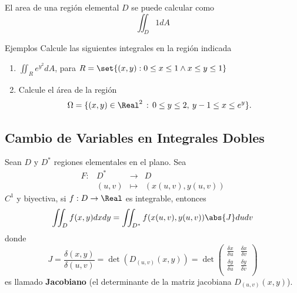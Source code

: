 \begin{frame}
\begin{rem}
  El area de una región elemental $D$ se puede calcular como
  $$\iint_D 1 dA$$
\end{rem}
\end{frame}

\begin{frame}{Ejemplos}
  Calcule las siguientes integrales en la región indicada\\[0.5cm]
  \begin{enumerate}[<+->]
    \item $\displaystyle\iint_{R} e^{y^2} dA$, para $R=\set{(x,y):0\leq x\leq 1\wedge x\leq y\leq 1}$\\[0.25cm]
    \item Calcule el área de la región
    $$\Omega=\{(x,y)\in\Real^2\,:\,0\leq y \leq 2, \: y-1 \leq x \leq e^y\}.$$
  \end{enumerate}
\end{frame}

\subsection{Cambio de Variables en Integrales Dobles}
\begin{frame}
\subsectionpage
\end{frame}


\begin{frame}
\begin{thm}
  Sean $D$ y $D^*$ regiones elementales en el plano. Sea 
  $$\begin{array}{rrcl}
    F:&D^*  &\to    & D\\
      &(u,v)&\mapsto& (x(u,v),y(u,v))
  \end{array}$$
  $C^1$ y biyectiva, si $f:D\to\Real$ es integrable, entonces
  $$\iint_D f(x,y) dxdy=\iint_{D^*} f(x(u,v),y(u,v))\abs{J} dudv$$
  donde
  $$J=\frac{\delta(x,y)}{\delta(u,v)}=\det(D_{(u,v)}(x,y))=\det\left(\begin{array}{rr}
    \frac{\delta x}{\delta u} & \frac{\delta x}{\delta v}\\
    \frac{\delta y}{\delta u} & \frac{\delta y}{\delta v}\\
  \end{array}\right)$$
  es llamado {\bf Jacobiano} (el determinante de la matriz jacobiana $D_{(u,v)}(x,y)$).
\end{thm}
\end{frame}

